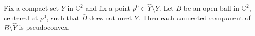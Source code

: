 
Fix a compact set $Y$ in $\mathbb{C}^2$ and fix a point $p^0 \in \hat{Y} \setminus Y$. Let $B$ be an open ball in $\mathbb{C}^2$, centered at $p^0$, such that $\bar{B}$ does not meet $Y$. Then each connected component of $B \setminus \hat{Y}$ is pseudoconvex.
